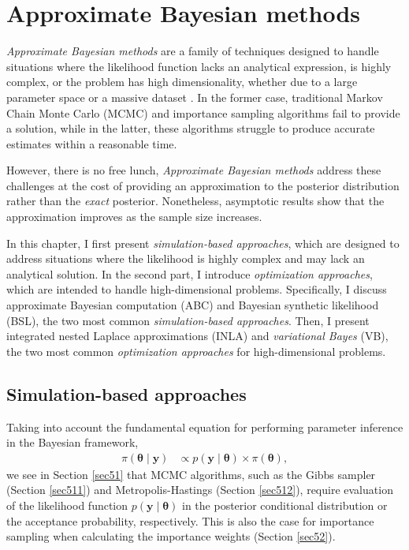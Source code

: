 \chapter{Approximate Bayesian methods}\label{chap15}

\textit{Approximate Bayesian methods} are a family of techniques designed to handle situations where the likelihood function lacks an analytical expression, is highly complex, or the problem has high dimensionality, whether due to a large parameter space or a massive dataset \cite{martin2024approximating}. In the former case, traditional Markov Chain Monte Carlo (MCMC) and importance sampling algorithms fail to provide a solution, while in the latter, these algorithms struggle to produce accurate estimates within a reasonable time.  

However, there is no free lunch, \textit{Approximate Bayesian methods} address these challenges at the cost of providing an approximation to the posterior distribution rather than the \textit{exact} posterior. Nonetheless, asymptotic results show that the approximation improves as the sample size increases.

In this chapter, I first present \textit{simulation-based approaches}, which are designed to address situations where the likelihood is highly complex and may lack an analytical solution. In the second part, I introduce \textit{optimization approaches}, which are intended to handle high-dimensional problems. Specifically, I discuss approximate Bayesian computation (ABC) and Bayesian synthetic likelihood (BSL), the two most common \textit{simulation-based approaches}. Then, I present integrated nested Laplace approximations (INLA) and \textit{variational Bayes} (VB), the two most common \textit{optimization approaches} for high-dimensional problems.

\section{Simulation-based approaches}\label{sec15_1}
Taking into account the fundamental equation for performing parameter inference in the Bayesian framework,  
\begin{align*}
	\pi(\boldsymbol{\theta} \mid \mathbf{y}) & \propto p(\mathbf{y} \mid \boldsymbol{\theta}) \times \pi(\boldsymbol{\theta}),
\end{align*}  
we see in Section \ref{sec51} that MCMC algorithms, such as the Gibbs sampler (Section \ref{sec511}) and Metropolis-Hastings (Section \ref{sec512}), require evaluation of the likelihood function \( p(\boldsymbol{y} \mid \boldsymbol{\theta}) \) in the posterior conditional distribution or the acceptance probability, respectively. This is also the case for importance sampling when calculating the importance weights (Section \ref{sec52}).  

